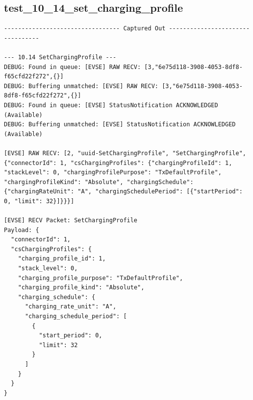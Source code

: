 \documentclass{article}
\begin{document}
\subsection*{test\_10\_14\_set\_charging\_profile}
\begin{lstlisting}
--------------------------------- Captured Out ---------------------------------

--- 10.14 SetChargingProfile ---
DEBUG: Found in queue: [EVSE] RAW RECV: [3,"6e75d118-3908-4053-8df8-f65cfd22f272",{}]
DEBUG: Buffering unmatched: [EVSE] RAW RECV: [3,"6e75d118-3908-4053-8df8-f65cfd22f272",{}]
DEBUG: Found in queue: [EVSE] StatusNotification ACKNOWLEDGED (Available)
DEBUG: Buffering unmatched: [EVSE] StatusNotification ACKNOWLEDGED (Available)

[EVSE] RAW RECV: [2, "uuid-SetChargingProfile", "SetChargingProfile", {"connectorId": 1, "csChargingProfiles": {"chargingProfileId": 1, "stackLevel": 0, "chargingProfilePurpose": "TxDefaultProfile", "chargingProfileKind": "Absolute", "chargingSchedule": {"chargingRateUnit": "A", "chargingSchedulePeriod": [{"startPeriod": 0, "limit": 32}]}}}]

[EVSE] RECV Packet: SetChargingProfile
Payload: {
  "connectorId": 1,
  "csChargingProfiles": {
    "charging_profile_id": 1,
    "stack_level": 0,
    "charging_profile_purpose": "TxDefaultProfile",
    "charging_profile_kind": "Absolute",
    "charging_schedule": {
      "charging_rate_unit": "A",
      "charging_schedule_period": [
        {
          "start_period": 0,
          "limit": 32
        }
      ]
    }
  }
}


\end{lstlisting}
\end{document}
